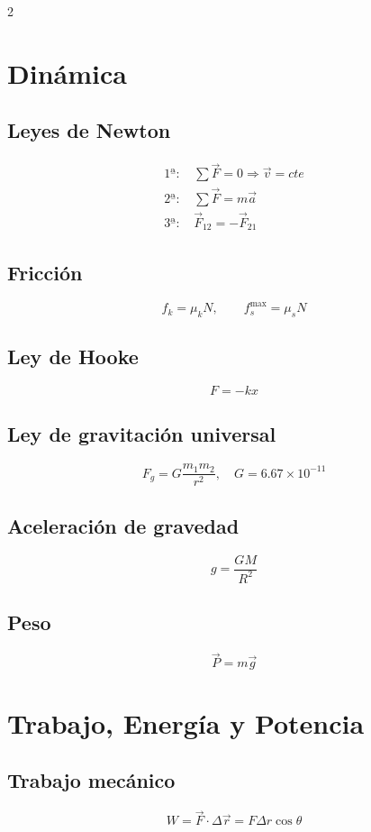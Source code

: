 \documentclass[10pt]{article}
\begin{document}
\begin{multicols}{2}
\section*{Dinámica}

\subsection*{Leyes de Newton}
\begin{align*}
    \text{1ª: } & \sum \vec{F}=0 \Rightarrow \vec{v}=cte \\
    \text{2ª: } & \sum \vec{F}=m\vec{a} \\
    \text{3ª: } & \vec{F}_{12}=-\vec{F}_{21}
\end{align*}

\subsection*{Fricción}
\[
f_k = \mu_k N,\qquad f_s^{\max} = \mu_s N
\]

\subsection*{Ley de Hooke}
\[
F = -k x
\]

\subsection*{Ley de gravitación universal}
\[
F_g = G \frac{m_1 m_2}{r^2},\quad G = 6.67\times10^{-11}
\]

\subsection*{Aceleración de gravedad}
\[
g = \frac{G M}{R^2}
\]

\subsection*{Peso}
\[
\vec{P} = m \vec{g}
\]

\section*{Trabajo, Energía y Potencia}

\subsection*{Trabajo mecánico}
\[
W = \vec{F} \cdot \Delta \vec{r} = F \Delta r \cos\theta
\]


\end{multicols}
\end{document}
